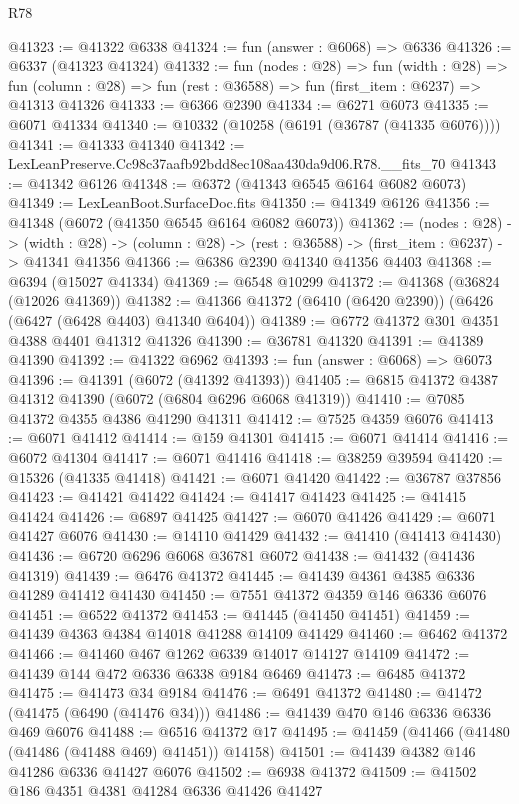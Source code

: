 \begin{lexlean}{R78}
\begin{coremodule}
@41323 := @41322 @6338
@41324 := fun (answer : @6068) => @6336
@41326 := @6337 (@41323 @41324)
@41332 := fun (nodes : @28) =>
  fun (width : @28) =>
  fun (column : @28) => fun (rest : @36588) => fun (first_item : @6237) => @41313 @41326
@41333 := @6366 @2390
@41334 := @6271 @6073
@41335 := @6071 @41334
@41340 := @10332 (@10258 (@6191 (@36787 (@41335 @6076))))
@41341 := @41333 @41340
@41342 := LexLeanPreserve.Cc98c37aafb92bdd8ec108aa430da9d06.R78.__fits_70
@41343 := @41342 @6126
@41348 := @6372 (@41343 @6545 @6164 @6082 @6073)
@41349 := LexLeanBoot.SurfaceDoc.fits
@41350 := @41349 @6126
@41356 := @41348 (@6072 (@41350 @6545 @6164 @6082 @6073))
@41362 := (nodes : @28) ->
  (width : @28) -> (column : @28) -> (rest : @36588) -> (first_item : @6237) -> @41341 @41356
@41366 := @6386 @2390 @41340 @41356 @4403
@41368 := @6394 (@15027 @41334)
@41369 := @6548 @10299
@41372 := @41368 (@36824 (@12026 @41369))
@41382 := @41366 @41372 (@6410 (@6420 @2390)) (@6426 (@6427 (@6428 @4403) @41340 @6404))
@41389 := @6772 @41372 @301 @4351 @4388 @4401 @41312 @41326
@41390 := @36781 @41320
@41391 := @41389 @41390
@41392 := @41322 @6962
@41393 := fun (answer : @6068) => @6073
@41396 := @41391 (@6072 (@41392 @41393))
@41405 := @6815 @41372 @4387 @41312 @41390 (@6072 (@6804 @6296 @6068 @41319))
@41410 := @7085 @41372 @4355 @4386 @41290 @41311
@41412 := @7525 @4359 @6076
@41413 := @6071 @41412
@41414 := @159 @41301
@41415 := @6071 @41414
@41416 := @6072 @41304
@41417 := @6071 @41416
@41418 := @38259 @39594
@41420 := @15326 (@41335 @41418)
@41421 := @6071 @41420
@41422 := @36787 @37856
@41423 := @41421 @41422
@41424 := @41417 @41423
@41425 := @41415 @41424
@41426 := @6897 @41425
@41427 := @6070 @41426
@41429 := @6071 @41427 @6076
@41430 := @14110 @41429
@41432 := @41410 (@41413 @41430)
@41436 := @6720 @6296 @6068 @36781 @6072
@41438 := @41432 (@41436 @41319)
@41439 := @6476 @41372
@41445 := @41439 @4361 @4385 @6336 @41289 @41412 @41430
@41450 := @7551 @41372 @4359 @146 @6336 @6076
@41451 := @6522 @41372
@41453 := @41445 (@41450 @41451)
@41459 := @41439 @4363 @4384 @14018 @41288 @14109 @41429
@41460 := @6462 @41372
@41466 := @41460 @467 @1262 @6339 @14017 @14127 @14109
@41472 := @41439 @144 @472 @6336 @6338 @9184 @6469
@41473 := @6485 @41372
@41475 := @41473 @34 @9184
@41476 := @6491 @41372
@41480 := @41472 (@41475 (@6490 (@41476 @34)))
@41486 := @41439 @470 @146 @6336 @6336 @469 @6076
@41488 := @6516 @41372 @17
@41495 := @41459 (@41466 (@41480 (@41486 (@41488 @469) @41451)) @14158)
@41501 := @41439 @4382 @146 @41286 @6336 @41427 @6076
@41502 := @6938 @41372
@41509 := @41502 @186 @4351 @4381 @41284 @6336 @41426 @41427

\end{coremodule}
\end{lexlean}
